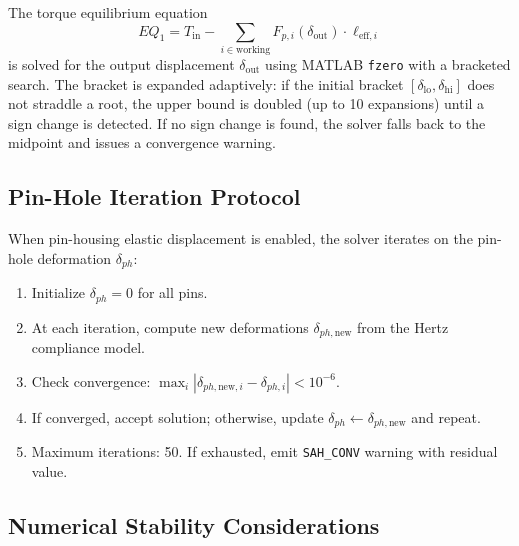 \documentclass{article}
\begin{document}
The torque equilibrium equation
\begin{equation}
EQ_1 = T_\text{in} - \sum_{i \in \text{working}} F_{p,i}(\delta_\text{out}) \cdot \ell_{\text{eff},i}
\end{equation}
is solved for the output displacement $\delta_\text{out}$ using MATLAB \texttt{fzero} with a bracketed search. The bracket is expanded adaptively: if the initial bracket $[\delta_\text{lo}, \delta_\text{hi}]$ does not straddle a root, the upper bound is doubled (up to 10 expansions) until a sign change is detected. If no sign change is found, the solver falls back to the midpoint and issues a convergence warning.

\subsection{Pin-Hole Iteration Protocol}

When pin-housing elastic displacement is enabled, the solver iterates on the pin-hole deformation $\delta_{ph}$:

\begin{enumerate}[leftmargin=1.2em]
    \item Initialize $\delta_{ph} = 0$ for all pins.
    \item At each iteration, compute new deformations $\delta_{ph,\text{new}}$ from the Hertz compliance model.
    \item Check convergence: $\max_i |\delta_{ph,\text{new},i} - \delta_{ph,i}| < 10^{-6}$.
    \item If converged, accept solution; otherwise, update $\delta_{ph} \leftarrow \delta_{ph,\text{new}}$ and repeat.
    \item Maximum iterations: 50. If exhausted, emit \texttt{SAH\_CONV} warning with residual value.
\end{enumerate}

\subsection{Numerical Stability Considerations}
\end{document}
